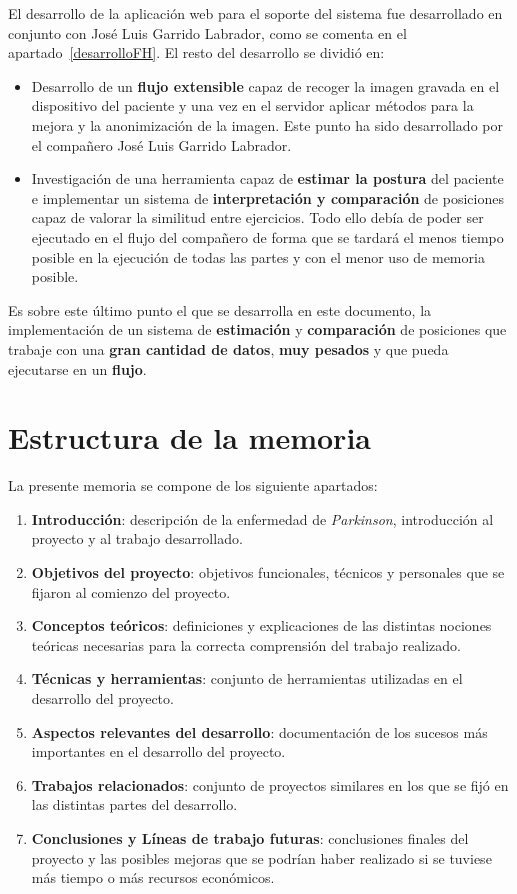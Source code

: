 El desarrollo de la aplicación web para el soporte del sistema fue desarrollado en conjunto con José Luis Garrido Labrador, como se comenta en el apartado~\ref{desarrolloFH}. El resto del desarrollo se dividió en:
\begin{itemize}
	\item Desarrollo de un \textbf{flujo extensible} capaz de recoger la imagen gravada en el dispositivo del paciente y una vez en el servidor aplicar métodos para la mejora y la anonimización de la imagen. Este punto ha sido desarrollado por el compañero José Luis Garrido Labrador.
	\item Investigación de una herramienta capaz de \textbf{estimar la postura} del paciente e implementar un sistema de \textbf{interpretación y comparación} de posiciones capaz de valorar la similitud entre ejercicios. Todo ello debía de poder ser ejecutado en el flujo del compañero de forma que se tardará el menos tiempo posible en la ejecución de todas las partes y con el menor uso de memoria posible.
\end{itemize}

Es sobre este último punto el que se desarrolla en este documento, la implementación de un sistema de \textbf{estimación} y \textbf{comparación} de posiciones que trabaje con una \textbf{gran cantidad de datos}, \textbf{muy pesados} y que pueda ejecutarse en un \textbf{flujo}.

\section{Estructura de la memoria}
La presente memoria se compone de los siguiente apartados:
\begin{enumerate}
	\item \textbf{Introducción}: descripción de la enfermedad de \textit{Parkinson}, introducción al proyecto y al trabajo desarrollado.
	\item \textbf{Objetivos del proyecto}: objetivos funcionales, técnicos y personales que se fijaron al comienzo del proyecto.
	\item \textbf{Conceptos teóricos}: definiciones y explicaciones de las distintas nociones teóricas necesarias para la correcta comprensión del trabajo realizado.
	\item \textbf{Técnicas y herramientas}: conjunto de herramientas utilizadas en el desarrollo del proyecto.
	\item \textbf{Aspectos relevantes del desarrollo}: documentación de los sucesos más importantes en el desarrollo del proyecto.
	\item \textbf{Trabajos relacionados}: conjunto de proyectos similares en los que se fijó en las distintas partes del desarrollo.
	\item \textbf{Conclusiones y Líneas de trabajo futuras}: conclusiones finales del proyecto y las posibles mejoras que se podrían haber realizado si se tuviese más tiempo o más recursos económicos.
\end{enumerate}

